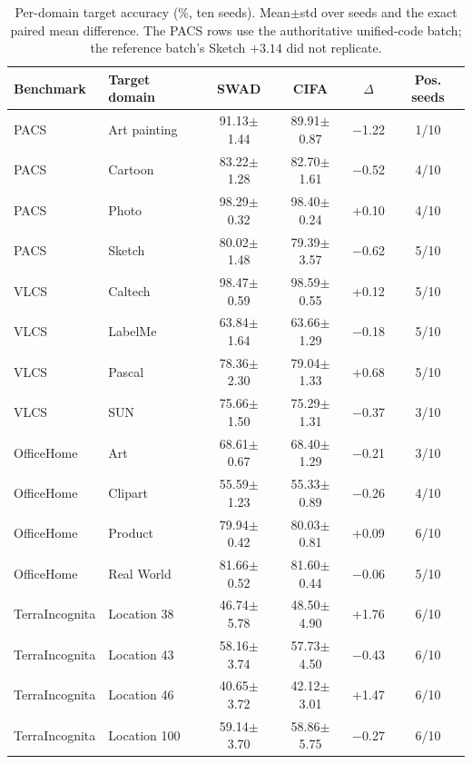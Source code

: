 \documentclass[electronics,article,submit,moreauthors]{Definitions/mdpi}
\newcommand{\add}[1]{\textcolor{addblue}{#1}}
\newcommand{\del}[1]{\textcolor{delred}{\st{#1}}}
\def\add#1{#1}%
\def\del#1{}%
\renewcommand{\add}[1]{#1}
\renewcommand{\del}[1]{}
\begin{document}
\begin{table}[H]
\caption{\del{Reference-implementation batch: per-domain target accuracy}\add{Per-domain target accuracy} (\%, ten seeds). Mean$\pm$std over seeds and the exact paired mean difference. \del{The PACS Sketch difference belongs to the single batch and is not treated as confirmed after replication.}\add{The PACS rows use the authoritative unified-code batch; the reference batch's Sketch $+3.14$ did not replicate.}}
\label{tab:perdomain}
\setlength{\tabcolsep}{6pt}
\begin{tabular}{llcccc}
\toprule
\textbf{Benchmark} & \textbf{Target domain} & \textbf{SWAD} & \textbf{CIFA} & $\Delta$ & \textbf{Pos. seeds}\\
\midrule
PACS & Art painting & \add{91.13$\pm$1.44} & \add{89.91$\pm$0.87} & \add{$-$1.22} & \add{1/10}\\
PACS & Cartoon & \add{83.22$\pm$1.28} & \add{82.70$\pm$1.61} & \add{$-$0.52} & \add{4/10}\\
PACS & Photo & \add{98.29$\pm$0.32} & \add{98.40$\pm$0.24} & \add{+0.10} & \add{4/10}\\
PACS & Sketch & \add{80.02$\pm$1.48} & \add{79.39$\pm$3.57} & \add{$-$0.62} & \add{5/10}\\
VLCS & Caltech & 98.47$\pm$0.59 & 98.59$\pm$0.55 & +0.12 & 5/10\\
VLCS & LabelMe & 63.84$\pm$1.64 & 63.66$\pm$1.29 & $-$0.18 & 5/10\\
VLCS & Pascal & 78.36$\pm$2.30 & 79.04$\pm$1.33 & +0.68 & 5/10\\
VLCS & SUN & 75.66$\pm$1.50 & 75.29$\pm$1.31 & $-$0.37 & 3/10\\
OfficeHome & Art & 68.61$\pm$0.67 & 68.40$\pm$1.29 & $-$0.21 & 3/10\\
OfficeHome & Clipart & 55.59$\pm$1.23 & 55.33$\pm$0.89 & $-$0.26 & 4/10\\
OfficeHome & Product & 79.94$\pm$0.42 & 80.03$\pm$0.81 & +0.09 & 6/10\\
OfficeHome & Real World & 81.66$\pm$0.52 & 81.60$\pm$0.44 & $-$0.06 & 5/10\\
TerraIncognita & Location 38 & 46.74$\pm$5.78 & 48.50$\pm$4.90 & +1.76 & 6/10\\
TerraIncognita & Location 43 & 58.16$\pm$3.74 & 57.73$\pm$4.50 & $-$0.43 & 6/10\\
TerraIncognita & Location 46 & 40.65$\pm$3.72 & 42.12$\pm$3.01 & +1.47 & 6/10\\
TerraIncognita & Location 100 & 59.14$\pm$3.70 & 58.86$\pm$5.75 & $-$0.27 & 6/10\\
\bottomrule
\end{tabular}
\end{table}
\end{document}
